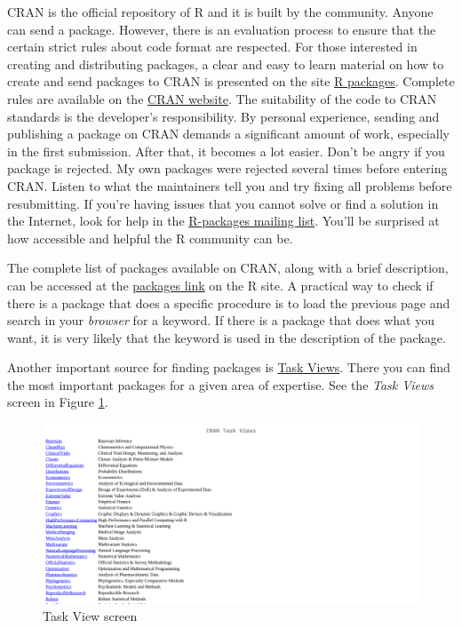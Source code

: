 \documentclass[11pt,]{book}
\begin{document}
CRAN is the official repository of R and it is built by the community.
Anyone can send a package. However, there is an evaluation process to
ensure that the certain strict rules about code format are respected.
For those interested in creating and distributing packages, a clear and
easy to learn material on how to create and send packages to CRAN is
presented on the site \href{http://r-pkgs.had.co.nz/intro.html}{R
packages}. Complete rules are available on the
\href{https://cran.r-project.org/web/packages/policies.html}{CRAN
website}. The suitability of the code to CRAN standards is the
developer's responsibility. By personal experience, sending and
publishing a package on CRAN demands a significant amount of work,
especially in the first submission. After that, it becomes a lot easier.
Don't be angry if you package is rejected. My own packages were rejected
several times before entering CRAN. Listen to what the maintainers tell
you and try fixing all problems before resubmitting. If you're having
issues that you cannot solve or find a solution in the Internet, look
for help in the \href{https://www.r-project.org/mail.html}{R-packages
mailing list}. You'll be surprised at how accessible and helpful the R
community can be.

The complete list of packages available on CRAN, along with a brief
description, can be accessed at the
\href{https://cran.r-project.org/}{packages link} on the R site. A
practical way to check if there is a package that does a specific
procedure is to load the previous page and search in your \emph{browser}
for a keyword. If there is a package that does what you want, it is very
likely that the keyword is used in the description of the package.

Another important source for finding packages is
\href{https://cran.r-project.org/web/views/}{Task Views}. There you can
find the most important packages for a given area of expertise. See the
\emph{Task Views} screen in Figure \ref{fig:TaskViews}.

\begin{figure}[!htbp]

{\centering \includegraphics[width=1\linewidth]{figs/TaskViews} 

}

\caption{Task View screen}\label{fig:TaskViews}
\end{figure}
\end{document}
